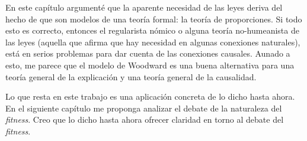 En este capítulo argumenté que la aparente necesidad de las leyes deriva del hecho de que son modelos de una teoría formal: la teoría de proporciones. Si todo esto es correcto, entonces el regularista nómico o alguna teoría no-humeanista de las leyes (aquella que afirma que hay necesidad en algunas conexiones naturales), está en serios problemas para dar cuenta de las conexiones causales. Aunado a esto, me parece que el modelo de Woodward es una buena alternativa para una teoría general de la explicación y una teoría general de la causalidad.

Lo que resta en este trabajo es una aplicación concreta de lo dicho hasta ahora. En el siguiente capítulo me proponga analizar el debate de la naturaleza del \emph{fitness}. Creo que lo dicho hasta ahora ofrecer claridad en torno al debate del \emph{fitness}.


